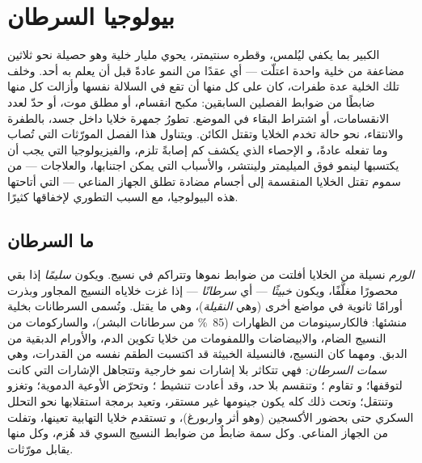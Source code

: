 \chapter{بيولوجيا السرطان}\label{ch:b3:cancer-biology}

 الكبير بما يكفي ليُلمس، وقطره سنتيمتر، يحوي مليار
خلية وهو حصيلة نحو ثلاثين مضاعفة من خلية واحدة اعتلّت
--- أي عقدًا من النمو عادةً قبل أن يعلم به أحد. وخلف تلك
الخلية عدة طفرات، كان على كل منها أن تقع في السلالة
نفسها وأزالت كل منها ضابطًا من ضوابط الفصلين
السابقين: مكبح انقسام، أو مطلق موت، أو حدّ
لعدد الانقسامات، أو اشتراط البقاء في الموضع. 
تطورُ جمهرة خلايا داخل جسد، بالطفرة والانتقاء،
نحو حالة تخدم الخلايا وتقتل الكائن. ويتناول هذا
الفصل المورّثات التي تُصاب وما تفعله عادةً، و
الإحصاء الذي يكشف كم إصابةً تلزم، والفيزيولوجيا التي يجب أن
يكتسبها  لينمو فوق الميليمتر ولينتشر، والأسباب
التي يمكن اجتنابها، والعلاجات --- من سموم تقتل الخلايا المنقسمة
إلى أجسام مضادة تطلق الجهاز المناعي ---
التي أتاحتها هذه البيولوجيا، مع السبب التطوري
لإخفاقها كثيرًا.

\section{ما السرطان}

\begin{definition}\label{def:b3:cancer-biology:hallmarks}
\emph{الورم} نسيلة من الخلايا أفلتت من
ضوابط نموها وتتراكم في نسيج. ويكون \emph{سليمًا}
إذا بقي محصورًا مغلَّفًا، ويكون \emph{خبيثًا} --- أي
\emph{سرطانًا} --- إذا غزت خلاياه النسيج المجاور وبذرت
أورامًا ثانوية في مواضع أخرى (وهي \emph{النقيلة})، وهي ما يقتل.
وتُسمى السرطانات بخلية منشئها: فالكارسينومات من الظهارات
(\qty{85}{\%} من سرطانات البشر)، والساركومات من النسيج الضام،
والابيضاضات واللمفومات من خلايا تكوين الدم، والأورام الدبقية من الدبق.
ومهما كان النسيج، فالنسيلة الخبيثة قد اكتسبت الطقم نفسه
من القدرات، وهي \emph{سمات السرطان}: فهي تتكاثر بلا
إشارات نمو خارجية وتتجاهل الإشارات التي كانت لتوقفها؛ و
تقاوم ؛ وتنقسم بلا حد، وقد أعادت تنشيط
؛ وتحرّض الأوعية الدموية؛ وتغزو وتنتقل؛
وتحت ذلك كله يكون جينومها غير مستقر، وتعيد برمجة
استقلابها نحو التحلل السكري حتى بحضور الأكسجين (وهو أثر واربورغ)، و
تستقدم خلايا التهابية تعينها، وتفلت من الجهاز
المناعي. وكل سمة ضابطٌ من ضوابط النسيج السوي قد هُزم، وكل
منها يقابل مورّثات.
\end{definition}


